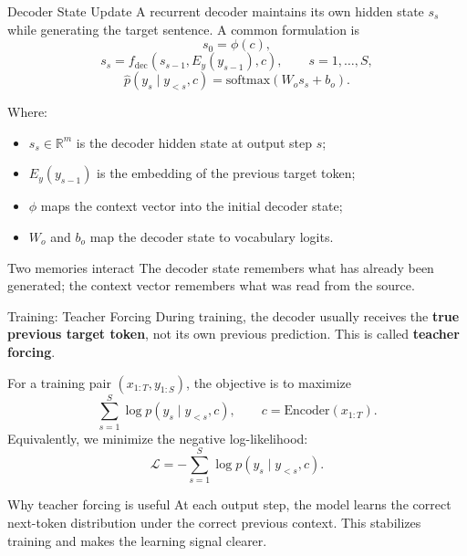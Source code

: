 \documentclass[aspectratio=169]{beamer}
\begin{document}
%
\begin{frame}{Decoder State Update}
\small
A recurrent decoder maintains its own hidden state $s_s$ while generating the target sentence.
A common formulation is
\[
  s_0 = \phi(c),
\]
\[
  s_s = f_{\mathrm{dec}}(s_{s-1}, E_y(y_{s-1}), c),
  \qquad s=1,\ldots,S,
\]
\[
  \hat{p}(y_s \mid y_{<s},c) = \mathrm{softmax}(W_o s_s + b_o).
\]

\vspace{0.15cm}
Where:
\begin{itemize}
  \item $s_s \in \mathbb{R}^{m}$ is the decoder hidden state at output step $s$;
  \item $E_y(y_{s-1})$ is the embedding of the previous target token;
  \item $\phi$ maps the context vector into the initial decoder state;
  \item $W_o$ and $b_o$ map the decoder state to vocabulary logits.
\end{itemize}

\begin{alertblock}{Two memories interact}
The decoder state remembers what has already been generated; the context vector remembers what was read from the source.
\end{alertblock}
\end{frame}
%
%
\begin{frame}{Training: Teacher Forcing}
\small
During training, the decoder usually receives the \textbf{true previous target token}, not its own previous prediction.
This is called \textbf{teacher forcing}.

\vspace{0.25cm}
For a training pair $(x_{1:T}, y_{1:S})$, the objective is to maximize
\[
  \sum_{s=1}^{S} \log p(y_s \mid y_{<s}, c),
  \qquad c = \mathrm{Encoder}(x_{1:T}).
\]
Equivalently, we minimize the negative log-likelihood:
\[
  \mathcal{L}
  = -\sum_{s=1}^{S} \log p(y_s \mid y_{<s}, c).
\]

\begin{block}{Why teacher forcing is useful}
At each output step, the model learns the correct next-token distribution under the correct previous context. This stabilizes training and makes the learning signal clearer.
\end{block}
\end{frame}
%
%
\end{document}
